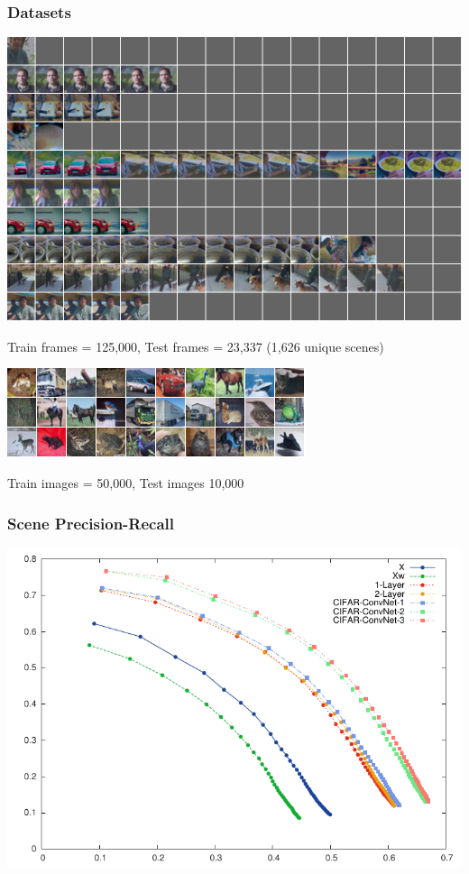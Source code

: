 \documentclass{beamer}
\begin{document}
\begin{frame}
\frametitle{Datasets} 
\centerline{\includegraphics[scale=0.4]{./images/TAE/youtube.png}} \vspace{0.1cm}
\centerline{Train frames = 125,000, Test frames = 23,337 (1,626 unique scenes)} 
\centerline{\includegraphics[scale=0.4]{./images/TAE/cifar.png}} 
\centerline{Train images = 50,000, Test images 10,000}
\end{frame}

\begin{frame}
\frametitle{Scene Precision-Recall} 
\centerline{\includegraphics[scale=0.8]{./images/TAE/AUC_time.pdf}} 
\end{frame}
\end{document}
